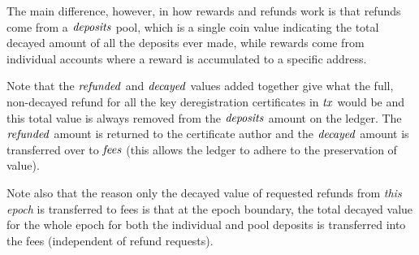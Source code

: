 The main difference, however, in how rewards and refunds work is that refunds
come from a $\mathit{deposits}$ pool, which is a single coin value indicating
the total decayed amount of all the deposits ever made, while rewards come from individual
accounts where a reward is accumulated to a specific address.

Note that the $\mathit{refunded}$ and $\mathit{decayed}$ values added together give what the
full, non-decayed refund for all the key deregistration certificates in $\mathit{tx}$
would be and this total value is always removed from the $\mathit{deposits}$
amount on the ledger. The $\mathit{refunded}$ amount is returned to the certificate
author and the $\mathit{decayed}$ amount is transferred over to $\mathit{fees}$
(this allows the ledger to adhere to the preservation of value).

Note also that the reason only the decayed value of requested refunds
from \textit{this epoch} is transferred to fees is that at the epoch
boundary, the total decayed value for the whole epoch for both the individual
and pool deposits is transferred into the fees (independent of refund
requests).


